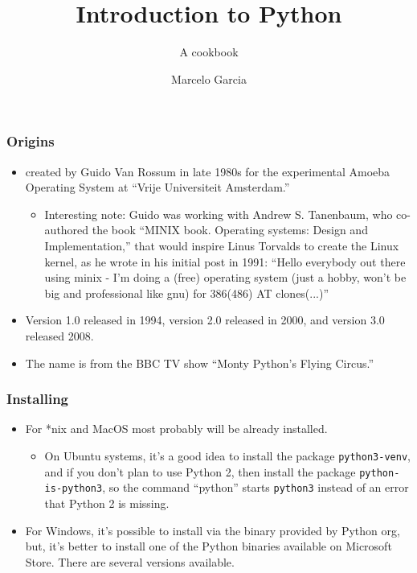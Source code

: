\documentclass[aspectratio=169]{beamer}
\title{Introduction to Python}
\subtitle{A cookbook}
\author{Marcelo Garcia}
\institute{KAUST Library}
\date{}
\begin{document}
\frame{\titlepage}

\begin{frame}
\frametitle{Origins}
\begin{itemize}
    \item created by Guido Van Rossum in late 1980s for the experimental Amoeba Operating System at ``Vrije Universiteit Amsterdam.'' 
    \begin{itemize}
        \item Interesting note: Guido was working with Andrew S. Tanenbaum, who co-authored the book ``MINIX book. Operating systems: Design and Implementation,'' that would inspire Linus Torvalds to create the Linux kernel, as he wrote in his initial post in 1991: ``Hello everybody out there using minix - I'm doing a (free) operating system (just a hobby, won't be big and professional like gnu) for 386(486) AT clones(...)''
    \end{itemize}
    \item Version 1.0 released in 1994, version 2.0 released in 2000, and version 3.0 released 2008.
    \item The name is from the BBC TV show ``Monty Python's Flying Circus.''
\end{itemize}
\end{frame}

\begin{frame}
\frametitle{Installing}
    \begin{itemize}
        \item For *nix and MacOS most probably will be already installed.
        \begin{itemize}
            \item On Ubuntu systems, it's a good idea to install the package \texttt{python3-venv}, and if you don't plan to use Python 2, then install the package \texttt{python-is-python3}, so the command ``python'' starts \texttt{python3} instead of an error that Python 2 is missing.
        \end{itemize}
        \item For Windows, it's possible to install via the binary provided by Python org, but, it's better to install one of the Python binaries available on Microsoft Store. There are several versions available.
    \end{itemize}
\end{frame}
\end{document}
